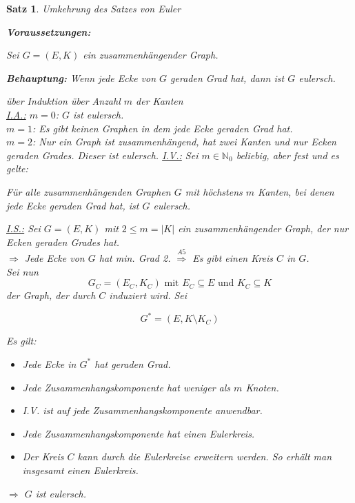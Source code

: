 \documentclass[a4paper,9pt]{scrartcl}
\newlength\Thmindent
\newenvironment{precondition}
  {\par\medskip\adjustwidth{\Thmindent}{}\normalfont\textbf{Voraussetzungen:}\par\nobreak}
  {\endadjustwidth}
\newenvironment{claim}
  {\par\medskip\adjustwidth{\Thmindent}{}\normalfont\textbf{Behauptung:}}
  {\endadjustwidth}
\theoremstyle{plain}
\newtheorem{theorem}{Satz}
\newcommand{\cmark}{\ding{51}}%
\begin{document}
\begin{theorem}{Umkehrung des Satzes von Euler}
    ~~~
    \begin{precondition}
        Sei $G = (E, K)$ ein zusammenhängender Graph.
    \end{precondition}
    \begin{claim}
        Wenn jede Ecke von $G$ geraden Grad hat, dann ist $G$ eulersch.
    \end{claim}
    \begin{Proof} über Induktion über Anzahl $m$ der Kanten\\
        \underline{I.A.:} $m=0$: $G$ ist eulersch. \cmark\\
        $m=1$: Es gibt keinen Graphen in dem jede Ecke geraden Grad hat. \cmark\\
        $m=2$: Nur ein Graph ist zusammenhängend, hat zwei Kanten und nur Ecken geraden Grades. Dieser ist eulersch. \cmark
        \goodbreak
        \underline{I.V.:} Sei $m \in \mathbb{N}_0$ beliebig, aber fest und
        es gelte:

        Für alle zusammenhängenden Graphen $G$ mit höchstens $m$ Kanten, bei denen jede Ecke geraden Grad hat, ist $G$ eulersch.

        \underline{I.S.:} Sei $G=(E,K)$ mit $2 \leq m  = |K|$ ein zusammenhängender Graph, der nur Ecken geraden Grades hat.\\
        $\Rightarrow$ Jede Ecke von $G$ hat min. Grad 2.
        $\stackrel{A5}{\Rightarrow}$ Es gibt einen Kreis $C$ in $G$.\\

        Sei nun
            \[G_C = (E_C, K_C) \text{ mit } E_C \subseteq E \text{ und } K_C \subseteq K \]
        der Graph, der durch $C$ induziert wird.
        Sei

            \[ G^* = (E, K \setminus K_C) \]

        Es gilt:
        \begin{itemize}
            \item Jede Ecke in $G^*$ hat geraden Grad.
            \item Jede Zusammenhangskomponente hat weniger als $m$ Knoten.
            \item[$\Rightarrow$] I.V. ist auf jede Zusammenhangskomponente anwendbar.
            \item[$\Rightarrow$] Jede Zusammenhangskomponente hat einen Eulerkreis.
            \item[$\Rightarrow$] Der Kreis $C$ kann durch die Eulerkreise erweitern werden. So erhält man insgesamt einen Eulerkreis.
        \end{itemize}
        $\Rightarrow$ $G$ ist eulersch.
    \end{Proof}
\end{theorem}
\vspace{0.5cm}
\end{document}
